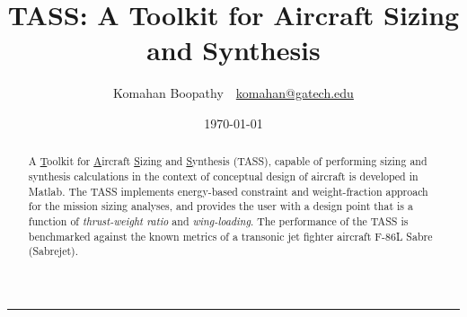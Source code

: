 \documentclass[pdftex,11pt,letter]{article}
\title{\textbf{\textsc{TASS}: A Toolkit for Aircraft Sizing and Synthesis}}
\author{Komahan Boopathy~~\url{komahan@gatech.edu}} \date{\today}
\begin{document}

\clearpage
\tableofcontents
\clearpage
\listoffigures
\listoftables

\maketitle
\vspace{-0.25in}
\rule{\linewidth}{2pt}

\begin{abstract}
A  \ul{T}oolkit for \ul{A}ircraft \ul{S}izing and \ul{S}ynthesis (TASS), capable of performing sizing and synthesis calculations  in the context of conceptual design of aircraft is developed in Matlab\cite{MATLAB}. The TASS implements energy-based constraint and weight-fraction approach for the mission sizing analyses, and provides the user with a design point that is a function of \emph{thrust-weight ratio} and \emph{wing-loading}.  The performance of the TASS is benchmarked against the known metrics of a transonic jet fighter aircraft F-86L Sabre (Sabrejet).
\end{abstract}
\end{document}
